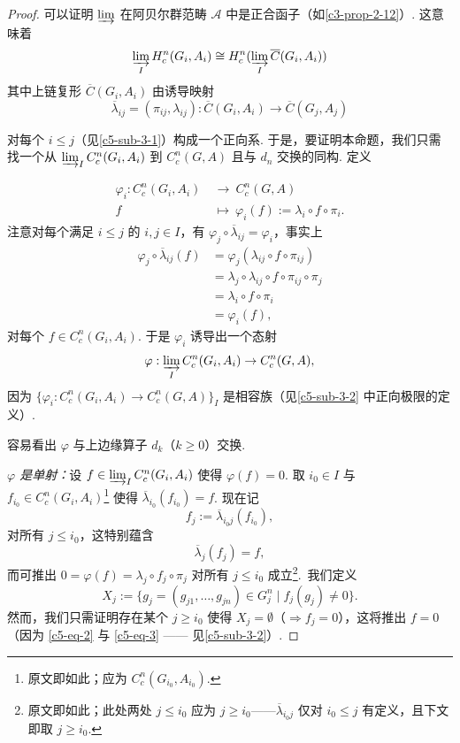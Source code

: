\begin{proof}
可以证明 $\varinjlim$ 在阿贝尔群范畴 $\mathscr{A}$ 中是正合函子（如\autoref{c3-prop-2-12}）. 这意味着
\[
\varinjlim_I H^n_c(G_i,A_i)\cong H^n_c(\varinjlim_I\overline{C}(G_i,A_i))
\]
其中上链复形 $\overline{C}(G_i,A_i)$ 由诱导映射
\[
\overline{\lambda}_{ij}=(\pi_{ij},\lambda_{ij}):\overline{C}(G_i,A_i)\to\overline{C}(G_j,A_j)
\]
\begin{sloppypar}
对每个 $i\leq j$（见\autoref{c5-sub-3-1}）构成一个正向系. 于是，要证明本命题，我们只需找一个从 $\varinjlim_I C^n_c(G_i,A_i)$ 到 $C^n_c(G,A)$ 且与 $d_n$ 交换的同构. 定义
\end{sloppypar}
\[
\begin{aligned}
\varphi_i:C^n_c(G_i,A_i)\ &\to\ C^n_c(G,A)\\
f\ &\mapsto\ \varphi_i(f):=\lambda_i\circ f\circ\pi_i.
\end{aligned}
\]
注意对每个满足 $i\leq j$ 的 $i,j\in I$，有 $\varphi_j\circ\overline{\lambda}_{ij}=\varphi_i$，事实上
\[
\begin{aligned}
\varphi_j\circ\overline{\lambda}_{ij}(f)&=\varphi_j(\lambda_{ij}\circ f\circ\pi_{ij})\\
&=\lambda_j\circ\lambda_{ij}\circ f\circ\pi_{ij}\circ\pi_j\\
&=\lambda_i\circ f\circ\pi_i\\
&=\varphi_i(f),
\end{aligned}
\]
对每个 $f\in C^n_c(G_i,A_i)$. 于是 $\varphi_i$ 诱导出一个态射
\[
\varphi:\varinjlim_I C^n_c(G_i,A_i)\to C^n_c(G,A),
\]
因为 $\{\varphi_i:C^n_c(G_i,A_i)\to C^n_c(G,A)\}_I$ 是相容族（见\autoref{c5-sub-3-2} 中正向极限的定义）.

容易看出 $\varphi$ 与上边缘算子 $d_k$（$k\geq 0$）交换.

\emph{$\varphi$ 是单射：}设 $f\in\varinjlim_I C^n_c(G_i,A_i)$ 使得 $\varphi(f)=0$. 取 $i_0\in I$ 与 $f_{i_0}\in C^n_c(G_i,A_i)$\footnote{原文即如此；应为 $C^n_c(G_{i_0},A_{i_0})$.} 使得 $\overline{\lambda}_{i_0}(f_{i_0})=f$. 现在记
\begin{equation}\label{c5-eq-2}
f_j:=\overline{\lambda}_{i_0 j}(f_{i_0}),
\end{equation}
对所有 $j\leq i_0$，这特别蕴含
\begin{equation}\label{c5-eq-3}
\overline{\lambda}_j(f_j)=f,
\end{equation}
而可推出 $0=\varphi(f)=\lambda_j\circ f_j\circ\pi_j$ 对所有 $j\leq i_0$ 成立\footnote{原文即如此；此处两处 $j\leq i_0$ 应为 $j\geq i_0$——$\overline{\lambda}_{i_0 j}$ 仅对 $i_0\leq j$ 有定义，且下文即取 $j\geq i_0$.}.\ 我们定义
\[
X_j:=\{g_j=(g_{j1},\ldots,g_{jn})\in G_j^n\mid f_j(g_j)\neq 0\}.
\]
然而，我们只需证明存在某个 $j\geq i_0$ 使得 $X_j=\emptyset$（$\Rightarrow f_j=0$），这将推出 $f=0$（因为 \eqref{c5-eq-2} 与 \eqref{c5-eq-3} —— 见\autoref{c5-sub-3-2}）.


\end{proof}

